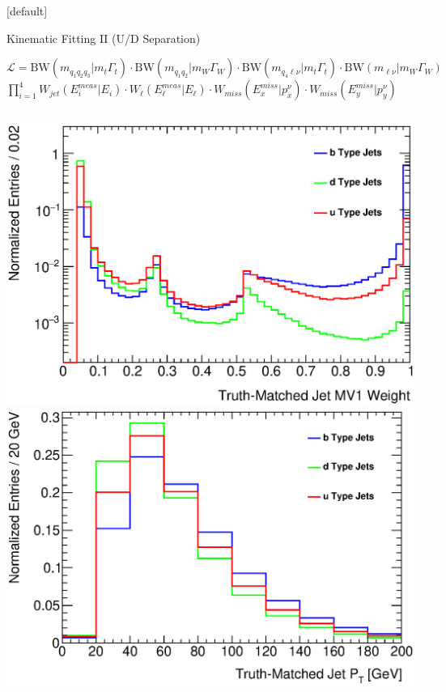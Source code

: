 \documentclass{beamer}
\begin{document}
{  \makeatletter %
  [default]
  \def\beamer@entrycode{\vspace*{-1.075\headheight}}
  \begin{frame}{Kinematic Fitting II (U/D Separation)}
    \begin{center}
      \footnotesize
      $\mathcal{L}=\text{BW}(m_{q_1q_2q_3}| m_t\Gamma_{t})\cdot \text{BW}(m_{q_1q_2}| m_{W}\Gamma_{W})\cdot \text{BW}(m_{q_4\ell\nu}| m_t\Gamma_{t})\cdot \text{BW}(m_{\ell\nu} | m_W\Gamma_{W}) \nonumber$ \\
      $\prod\limits_{i=1}^4 W_{jet}(E_{i}^{meas}|E_{i})\cdot W_{\ell}(E_{\ell}^{meas}|E_{\ell})\cdot W_{miss}(E_{x}^{miss}|p_{x}^{\nu})\cdot W_{miss}(E_{y}^{miss}|p_{y}^{\nu})$
    \end{center}
    \begin{columns}
      \includegraphics[width=\textwidth]{../chapters/whel/figures/mv1_template_5jetOPT}\\\vspace{-5pt}
      \includegraphics[width=\textwidth]{../chapters/whel/figures/pt_template_5jetOPT}\\\vspace{-5pt}

\end{columns}
\end{frame}}
\end{document}
